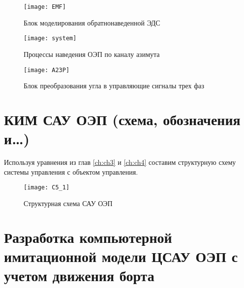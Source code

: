 \begin{figure}[ht]
	\centering
	\texttt{[image: EMF]} 
	\caption{Блок моделирования обратнонаведенной ЭДС}
	\label{fig:EMF}
\end{figure}








\begingroup
\captiondelim{ } %

\endgroup
 
 
\begin{figure}[ht]
 	\centering
 	\texttt{[image: system]} 
 	\caption{Процессы наведения ОЭП по каналу азимута}
 	\label{fig:az_true}
\end{figure}



\begin{figure}[ht]
	\centering
	\texttt{[image: A23P]} 
	\caption{Блок преобразования угла в управляющие сигналы трех фаз}
	\label{fig:a2p}
\end{figure}


















\section{КИМ САУ ОЭП (схема, обозначения и…) } \label{ch:ch5/sect2}

Используя  уравнения из глав \ref{ch:ch3} и \ref{ch:ch4} составим структурную схему системы управления с объектом управления.
 
\begin{figure}[ht]
	\centering
	\texttt{[image: C5\_1]} 
	\caption{Структурная схема САУ ОЭП}
	\label{fig:structure}
\end{figure}


\section{Разработка компьютерной имитационной модели ЦСАУ ОЭП с учетом  движения борта} \label{ch:ch5/sect3}



